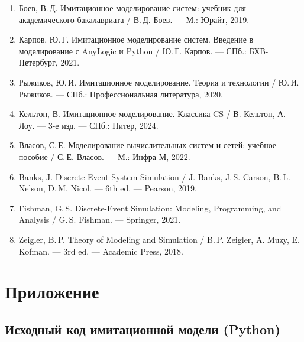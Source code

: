 \documentclass[14pt,a4paper]{extarticle}
\begin{document}
\begin{enumerate}
  \item Боев, В.\,Д. Имитационное моделирование систем: учебник для
        академического бакалавриата / В.\,Д. Боев. --- М.: Юрайт, 2019.
  \item Карпов, Ю.\,Г. Имитационное моделирование систем. Введение в
        моделирование с AnyLogic и Python / Ю.\,Г. Карпов. --- СПб.:
        БХВ-Петербург, 2021.
  \item Рыжиков, Ю.\,И. Имитационное моделирование. Теория и технологии /
        Ю.\,И. Рыжиков. --- СПб.: Профессиональная литература, 2020.
  \item Кельтон, В. Имитационное моделирование. Классика CS / В. Кельтон,
        А. Лоу. --- 3-е изд. --- СПб.: Питер, 2024.
  \item Власов, С.\,Е. Моделирование вычислительных систем и сетей: учебное
        пособие / С.\,Е. Власов. --- М.: Инфра-М, 2022.
  \item Banks, J. Discrete-Event System Simulation / J. Banks, J.\,S. Carson,
        B.\,L. Nelson, D.\,M. Nicol. --- 6th ed. --- Pearson, 2019.
  \item Fishman, G.\,S. Discrete-Event Simulation: Modeling, Programming, and
        Analysis / G.\,S. Fishman. --- Springer, 2021.
  \item Zeigler, B.\,P. Theory of Modeling and Simulation / B.\,P. Zeigler,
        A. Muzy, E. Kofman. --- 3rd ed. --- Academic Press, 2018.
\end{enumerate}

\newpage
\section*{Приложение}

\subsection*{Исходный код имитационной модели (Python)}
\end{document}
